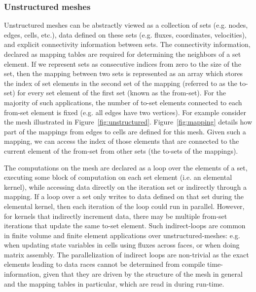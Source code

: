 \subsubsection{Unstructured meshes}\label{unstructured-meshes}

\noindent Unstructured meshes can be abstractly viewed as a collection of sets 
(e.g. nodes, edges, cells, etc.), data defined on these sets (e.g. fluxes, 
coordinates, velocities), and explicit connectivity information between 
sets. The connectivity information, declared as mapping tables are required for 
determining the neighbors of a set element. If we represent sets as consecutive 
indices from zero to the size of the set, then the mapping between two 
sets is represented as an array which stores the index of set elements in the 
second set of the mapping (referred to as the to-set) for every set element of 
the first set (known as the from-set). For the majority of such applications, the number of to-set elements connected to each from-set element is fixed (e.g. all edges have two vertices). For example consider the mesh illustrated 
in Figure~\ref{fig:unstructured}. Figure~\ref{fig:mapping} details how part of 
the mappings from edges to cells are defined for this mesh. Given such a 
mapping, we can access the index of those elements that are connected to the 
current element of the from-set from other sets (the to-sets of the mappings). 

The computations on the mesh are declared as a loop over the elements of a set, 
executing some block of computation on each set element (i.e. an elemental kernel), 
while accessing data directly on the iteration set or indirectly through a 
mapping.  If a loop over a set only writes to data defined on that set during the 
elemental kernel, then each iteration of the loop could run in parallel. 
However, for kernels that indirectly increment data, there may be multiple 
from-set iterations that update the same to-set element. Such indirect-loops are 
common in finite volume and finite element applications over 
unstructured-meshes: e.g. when updating state variables in cells using fluxes 
across faces, or when doing matrix assembly. The parallelization of indirect 
loops are non-trivial as the exact elements leading to data races cannot be 
determined from compile time-information, given that they are driven by the 
structure of the mesh in general and the mapping tables in particular, which are 
read in during run-time. 



